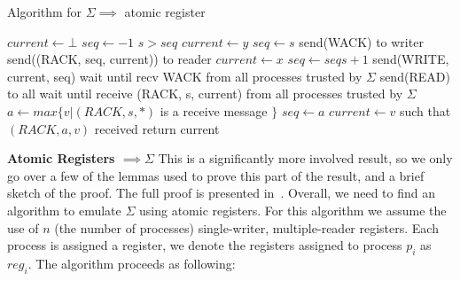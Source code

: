 \begin{algorithm}
\caption{Algorithm for $\Sigma \implies$ atomic register}
\label{alg:swsr}
\begin{algorithmic}[1]
    \State $current \gets \bot$
    \State $seq \gets -1$
        \If $s > seq$
           \State $current \gets y$
           \State $seq \gets s$
           \State send(WACK) to writer
        \EndIf
    \EndUpon
        \State send((RACK, seq, current)) to reader
    \EndUpon
\EndProcedure
{}
    \State $current \gets x$
    \State $seq \gets seqs + 1$
    \State send(WRITE, current, seq)
    \State wait until recv WACK from all processes trusted by $\Sigma$
\EndProcedure
{}
    \State send(READ) to all
    \State wait until receive (RACK, s, current) from all processes trusted by $\Sigma$
    \State $a \gets max\{v | (RACK, s, *)$ is a receive message $\}$
        \State $seq \gets a$
        \State $current \gets v$ such that $(RACK, a, v)$ received
    \EndIf
    \State return current
\EndProcedure
\end{algorithmic}
\end{algorithm}
\textbf{Atomic Registers $\implies \Sigma$}
This is a significantly more involved result, so we only go over a few of the lemmas used to prove this part of the
result, and a brief sketch of the proof. The full proof is presented in~\cite{delporte2003shared}.  Overall, we need to find an algorithm to emulate $\Sigma$ using atomic
registers. For this algorithm we assume the use of $n$ (the number of processes) single-writer, multiple-reader
registers. Each process is assigned a register, we denote the registers assigned to process $p_i$ as $reg_i$.
The algorithm proceeds as following:
